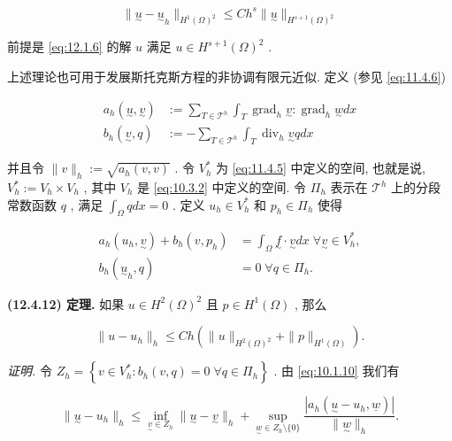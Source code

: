 $$
\|\underset{\sim}{u} - \underset{\sim}{u}_{h}\|_{H^{1}(\Omega)^{2}} \leq C h^{s} \|\underset{\sim}{u}\|_{H^{s + 1}(\Omega)^{2}}
$$

前提是 \eqref{eq:12.1.6} 的解 $u$ 满足 $u \in H^{s + 1}(\Omega)^{2}$ .

上述理论也可用于发展斯托克斯方程的非协调有限元近似. 定义 (参见 \eqref{eq:11.4.6}) 

\begin{equation}
\begin{aligned}
a_{h}(\underset{\sim}{u}, \underset{\sim}{v}) &\mathrel{\text{:=}} \sum_{T \in \mathcal{T}^{h}} \int_{T} \operatorname{grad}_{h}\underset{\sim}{v} : \operatorname{grad}_{h}\underset{\sim}{w} dx \\
b_{h}(\underset{\sim}{v}, q) &\mathrel{\text{:=}} - \sum_{T \in \mathcal{T}^{h}} \int_{T} \operatorname{div}_{h}\underset{\sim}{v} q dx
\end{aligned}
\end{equation}

并且令 $\|v\|_{h} \mathrel{\text{:=}} \sqrt{a_{h}(v, v)}$ . 令 $V_{h}^{*}$ 为 \eqref{eq:11.4.5} 中定义的空间, 也就是说, $V_{h}^{*} \mathrel{\text{:=}} V_{h} \times V_{h}$ , 其中 $V_{h}$ 是 \eqref{eq:10.3.2} 中定义的空间. 令 $\varPi_{h}$ 表示在 $\mathcal{T}^{h}$ 上的分段常数函数 $q$ , 满足 $\int_{\Omega} q dx = 0$ . 定义 $u_{h} \in V_{h}^{*}$ 和 $p_{h} \in \varPi_{h}$ 使得

\begin{equation}\label{eq:12.4.11}
\begin{aligned}
a_{h}(u_{h}, \underset{\sim}{v}) + b_{h}(v, p_{h}) &= \int_{\Omega} \underset{\sim}{f} \cdot \underset{\sim}{v} dx \;\forall \underset{\sim}{v} \in V_{h}^{*}, \\
b_{h}(\underset{\sim}{u}_{h}, q) &= 0 \;\forall q \in \varPi_{h}.
\end{aligned}
\end{equation}

\textbf{(12.4.12) 定理.} 如果 $u \in H^{2}(\Omega)^{2}$ 且 $p \in H^{1}(\Omega)$ , 那么

$$
\|u - u_{h}\|_{h} \leq C h \left( \|u\|_{H^{2}(\Omega)^{2}} + \|p\|_{H^{1}(\Omega)} \right).
$$

\textit{证明.} 令 $Z_{h} = \left\{ v \in V_{h}^{*} : b_{h}(v, q) = 0 \;\forall q \in \varPi_{h} \right\}$ . 由 \eqref{eq:10.1.10} 我们有

$$
\|\underset{\sim}{u} - u_{h}\|_{h} \leq \inf_{\underset{\sim}{v} \in Z_{h}} \|\underset{\sim}{u} - \underset{\sim}{v}\|_{h} + \sup_{\underset{\sim}{w} \in Z_{h} \setminus \{0\}} \frac{|a_{h}(\underset{\sim}{u} - u_{h}, \underline{w})|}{\|\underset{\sim}{w}\|_{h}}.
$$

